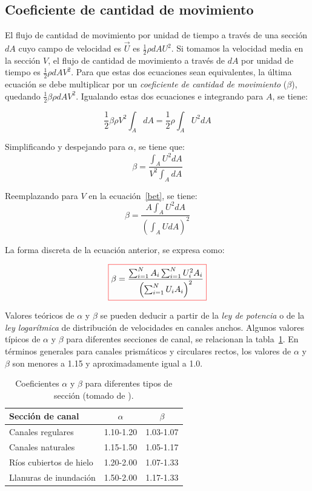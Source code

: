 \documentclass[11pt, oneside]{article}
\begin{document}
\subsection{Coeficiente de cantidad de movimiento}
El flujo de cantidad de movimiento por unidad de tiempo a trav\'es de una secci\'on $dA$ cuyo campo de velocidad es $\vec{U}$ es $\frac{1}{2}\rho dA U^2$. Si tomamos la velocidad media en la secci\'on $V$, el flujo de cantidad de movimiento a trav\'es de $dA$ por unidad de tiempo es $\frac{1}{2}\rho dA V^2$. Para que estas dos ecuaciones sean equivalentes, la \'ultima ecuaci\'on se debe multiplicar por un \emph{coeficiente de cantidad de movimiento} ($\beta$), quedando $\frac{1}{2}\beta \rho dA V^2$. Igualando estas dos ecuaciones e integrando para $A$, se tiene:

$$
\frac{1}{2}\beta\rho V^2 \int_A dA  = \frac{1}{2}\rho \int_A U^2 dA 
$$

Simplificando y despejando para $\alpha$, se tiene que:
\begin{equation}
\beta = \frac{\int_A U^2 dA}{V^2 \int_A dA}
\label{bet}
\end{equation}

Reemplazando para $V$ en la ecuaci\'on~\ref{bet}, se tiene:
\begin{equation}
\beta = \frac{A \int_A U^2 dA}{\left(\int_A U dA \right)^2 }
\label{bet2}
\end{equation}

La forma discreta de la ecuaci\'on anterior, se expresa como:

\begin{equation}
\color{red}\boxed{\color{black} \beta = \frac{\sum_{i=1}^{N}A_i \sum_{i=1}^{N} U_i^2 A_i} {\left(\sum_{i=1}^{N} U_i A_i \right)^2 }}
\label{bet3}
\end{equation}

Valores teóricos de $\alpha$ y $\beta$ se pueden deducir a partir de la \emph{ley de potencia} o de la \emph{ley logarítmica} de distribuci\'on de velocidades en canales anchos. Algunos valores típicos de $\alpha$ y $\beta$ para diferentes secciones de canal, se relacionan la tabla~\ref{tab1}. En términos generales para canales prismáticos y circulares rectos, los valores de $\alpha$ y $\beta$ son menores a 1.15 y aproximadamente igual a 1.0.

\begin{table}[h!]
\centering
\begin{tabular}{l c c}
 \hline
 Secci\'on de canal & $\alpha$ & $\beta$ \\ [0.5ex]
 \hline\hline
Canales regulares & 1.10-1.20 & 1.03-1.07 \\
Canales naturales & 1.15-1.50 & 1.05-1.17 \\
R\'ios cubiertos de hielo & 1.20-2.00 & 1.07-1.33 \\
Llanuras de inundaci\'on & 1.50-2.00 & 1.17-1.33 \\
\hline
\end{tabular}
\caption{Coeficientes $\alpha$ y $\beta$ para diferentes tipos de secci\'on (tomado de \cite{Chau}).}
\label{tab1}
\end{table}
\end{document}
